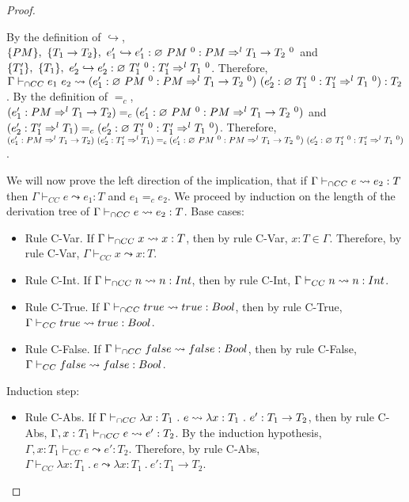 \documentclass[a4paper]{article}
\begin{document}
\begin{proof}
\begin{itemize}
    By the definition of $\hookrightarrow$, $\{PM\},\ \{T_1 \rightarrow T_2\},\ e_1' \hookrightarrow e_1' : \varnothing\ PM\ ^{0} : PM \Rightarrow^l T_1 \rightarrow T_2\ ^0$ and $\{T_1'\},\ \{T_1\},\ e_2' \hookrightarrow e_2' : \emptycast{T_1'}{0} : T_1' \Rightarrow^l T_1\ ^0$.
    Therefore, $\Gamma \vdash_{\cap CC} e_1\ e_2 \leadsto (e_1' : \varnothing\ PM\ ^{0} : PM \Rightarrow^l T_1 \rightarrow T_2\ ^0)\ (e_2' : \varnothing\ T_1'\ ^{0} : T_1' \Rightarrow^l T_1\ ^0) : T_2$.
    By the definition of $=_c$, $(e_1' : PM \Rightarrow^l T_1 \rightarrow T_2) =_c (e_1' : \emptycast{PM}{0} : PM \Rightarrow^l T_1 \rightarrow T_2\ ^0)$ and $(e_2' : T_1' \Rightarrow^l T_1) =_c (e_2' : \emptycast{T_1'}{0} : T_1' \Rightarrow^l T_1\ ^0)$.
    Therefore, $(e_1' : PM \Rightarrow^l T_1 \rightarrow T_2)\ (e_2' : T_1' \Rightarrow^l T_1) =_c (e_1' : \emptycast{PM}{0} : PM \Rightarrow^l T_1 \rightarrow T_2\ ^0)\ (e_2' : \emptycast{T_1'}{0} : T_1' \Rightarrow^l T_1\ ^0)$.
\end{itemize}
We will now prove the left direction of the implication, that if $\Gamma \vdash_{\cap CC} e \leadsto e_2 : T$ then $\Gamma \vdash_{CC} e \leadsto e_1 : T$ and $e_1 =_{c} e_2$.
We proceed by induction on the length of the derivation tree of $\Gamma \vdash_{\cap CC} e \leadsto e_2 : T$.
Base cases:
\begin{itemize}
    \item Rule C-Var.
    If $\Gamma \vdash_{\cap CC} x \leadsto x : T$, then by rule C-Var, $x : T \in \Gamma$.
    Therefore, by rule C-Var, $\Gamma \vdash_{CC} x \leadsto x : T$.
    \item Rule C-Int.
    If $\Gamma \vdash_{\cap CC} n \leadsto n : {Int}$, then by rule C-Int, $\Gamma \vdash_{CC} n \leadsto n : {Int}$.
    \item Rule C-True.
    If $\Gamma \vdash_{\cap CC} true \leadsto true : Bool$, then by rule C-True, $\Gamma \vdash_{CC} true \leadsto true : Bool$.
    \item Rule C-False.
    If $\Gamma \vdash_{\cap CC} false \leadsto false : Bool$, then by rule C-False, $\Gamma \vdash_{CC} false \leadsto false : Bool$.
\end{itemize}
Induction step:
\begin{itemize}
    \item Rule C-Abs.
    If $\Gamma \vdash_{\cap CC} \lambda x : T_1\ .\ e \leadsto \lambda x : T_1\ .\ e' : T_1 \rightarrow T_2$, then by rule C-Abs, $\Gamma, x : T_1 \vdash_{\cap CC} e \leadsto e' : T_2$.
    By the induction hypothesis, $\Gamma, x : T_1 \vdash_{CC} e \leadsto e' : T_2$.
    Therefore, by rule C-Abs, $\Gamma \vdash_{CC} \lambda x : T_1\ .\ e \leadsto \lambda x : T_1\ .\ e' : T_1 \rightarrow T_2$.

\end{itemize}
\end{proof}
\end{document}
